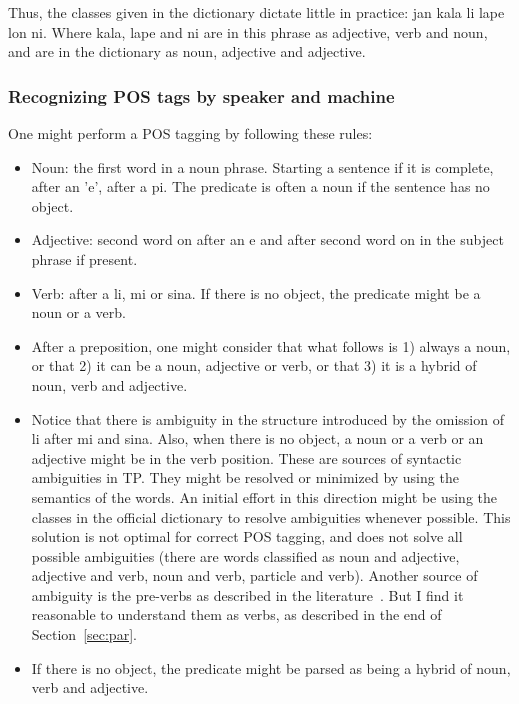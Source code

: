 Thus, the classes given in the dictionary dictate little
in practice:
jan kala li lape lon ni.
Where kala, lape and ni are in this phrase
as adjective, verb and noun,
and are in the dictionary as noun,
adjective and adjective.

\subsubsection{Recognizing POS tags by speaker and machine}\label{sec:rec}
One might perform a POS tagging by following these rules:
\begin{itemize}
  \item Noun: the first word in a noun phrase.
    Starting a sentence if it is complete,
    after an 'e', after a pi.
    The predicate is often a noun
    if the sentence has no object.
  \item Adjective: second word on after an e and after
    second word on in the subject phrase if present.
  \item Verb: after a li, mi or sina.
    If there is no object, the predicate
    might be a noun or a verb.
  \item After a preposition, one might consider that what follows is 1) always
    a noun, or that 2) it can be a noun, adjective or verb,
    or that 3) it is a hybrid of noun, verb and adjective.~\cite{janKipo}
  \item Notice that there is ambiguity in the structure
    introduced by the omission of li after mi and sina.
    Also, when there is no object, a noun or a verb
    or an adjective might be in the verb position.
    These are sources of syntactic ambiguities
    in TP.
    They might be resolved or minimized by using the semantics
    of the words.
    An initial effort in this direction might be
    using the classes in the official dictionary to resolve
    ambiguities whenever possible.
    This solution is not optimal for correct POS tagging,
    and does not solve all possible ambiguities
    (there are words classified as noun and adjective,
    adjective and verb, noun and verb, particle and verb).
    Another source of ambiguity is the pre-verbs as described
    in the literature~\cite{tpLang,kama}.
    But I find it reasonable to understand them as verbs,
    as described in the end of Section~\ref{sec:par}.
  \item If there is no object, the predicate might be parsed
as being a hybrid of noun, verb and adjective.
\end{itemize}

